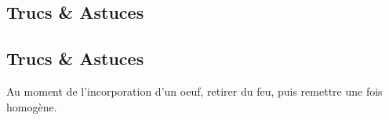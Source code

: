     \vspace{1cm}
    \hline
    \vspace{1cm}
    
    \subsection{Trucs \& Astuces}
        \subsection{Trucs \& Astuces}
	Au moment de l'incorporation d'un oeuf, retirer du feu, puis remettre une fois homogène.
